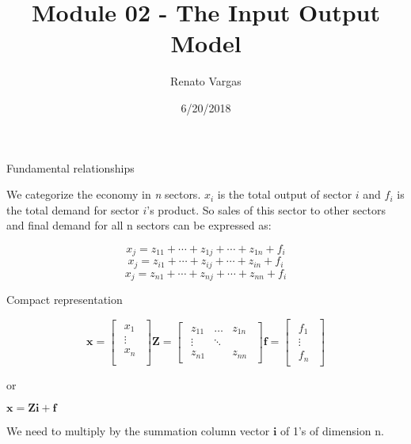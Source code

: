 \documentclass[ignorenonframetext,]{beamer}
\title{Module 02 - The Input Output Model}
\author{Renato Vargas}
\date{6/20/2018}
\begin{document}
\frame{\titlepage}

\begin{frame}{Fundamental relationships}

We categorize the economy in \emph{n} sectors. \(x_i\) is the total
output of sector \(i\) and \(f_i\) is the total demand for sector
\(i\)'s product. So sales of this sector to other sectors and final
demand for all n sectors can be expressed as:

\[
\begin{equation}
x_j=z_{11}+\cdots+z_{1j}+\cdots+z_{1n}+f_i
\end{equation}
\] \[
\begin{equation}
x_j=z_{i1}+\cdots+z_{ij}+\cdots+z_{in}+f_i
\end{equation}
\] \[
\begin{equation}
x_j=z_{n1}+\cdots+z_{nj}+\cdots+z_{nn}+f_i
\end{equation} 
\]

\end{frame}

\begin{frame}{Compact representation}

\[\begin{equation} \mathbf{x} = \begin{bmatrix} \begin{array}{c} x_1 \\ \vdots\\ x_n\\ \end{array} \end{bmatrix} \mathbf{Z} = \begin{bmatrix}\begin{array}{ccc} z_{11} & \ldots & z_{1n} \\ \vdots &  \ddots &  \\ z_{n1} &  & z_{nn} \end{array} \end{bmatrix} \mathbf{f}= \begin{bmatrix} \begin{array}{c} f_{1} \\ \vdots  \\ f_{n} \end{array} \end{bmatrix}\end{equation}\]

or

\(\mathbf{x} = \mathbf{Zi} + \mathbf{f}\)

 We need to multiply by the summation column vector \(\mathbf{i}\) of
1's of dimension n.

\end{frame}
\end{document}
